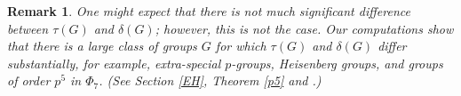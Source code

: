 \documentclass[a4paper,11pt]{amsart}
\numberwithin{equation}{section}
\numberwithin{equation}{subsection}
\newtheorem{remark}[theorem]{Remark}
\newcommand{\poonam}[1]{{\color{blue} #1}}
\begin{document}
	
	
	\begin{remark}
		One might expect that there is not much significant difference between $\tau(G)$ and $\delta(G)$; however, this is not the case. Our computations show that there is a large class of groups $G$ for which $\tau(G)$ and $\delta(G)$ differ substantially, for example, extra-special $p$-groups, Heisenberg groups, and groups of order $p^5$ in $\Phi_7$. (See Section \ref{EH}, Theorem \ref{p5} and \cite[Theorem 3.1]{kaur}.) 
	\end{remark} 
	
	
	
\end{document}
